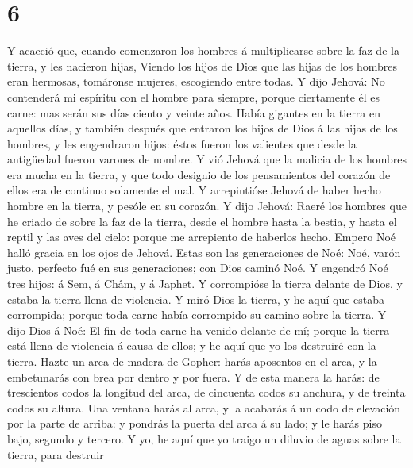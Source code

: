 \hypertarget{section-5}{%
\section{6}\label{section-5}}

 Y acaeció que, cuando comenzaron los hombres á
multiplicarse sobre la faz de la tierra, y les nacieron hijas,
 Viendo los hijos de Dios que las hijas de los hombres
eran hermosas, tomáronse mujeres, escogiendo entre todas. 
Y dijo Jehová: No contenderá mi espíritu con el hombre para siempre,
porque ciertamente él es carne: mas serán sus días ciento y veinte años.
 Había gigantes en la tierra en aquellos días, y también
después que entraron los hijos de Dios á las hijas de los hombres, y les
engendraron hijos: éstos fueron los valientes que desde la antigüedad
fueron varones de nombre.  Y vió Jehová que la malicia de
los hombres era mucha en la tierra, y que todo designio de los
pensamientos del corazón de ellos era de continuo solamente el mal.
 Y arrepintióse Jehová de haber hecho hombre en la tierra,
y pesóle en su corazón.  Y dijo Jehová: Raeré los hombres
que he criado de sobre la faz de la tierra, desde el hombre hasta la
bestia, y hasta el reptil y las aves del cielo: porque me arrepiento de
haberlos hecho.  Empero Noé halló gracia en los ojos de
Jehová.  Estas son las generaciones de Noé: Noé, varón
justo, perfecto fué en sus generaciones; con Dios caminó Noé.
 Y engendró Noé tres hijos: á Sem, á Châm, y á Japhet.
 Y corrompióse la tierra delante de Dios, y estaba la
tierra llena de violencia.  Y miró Dios la tierra, y he
aquí que estaba corrompida; porque toda carne había corrompido su camino
sobre la tierra.  Y dijo Dios á Noé: El fin de toda carne
ha venido delante de mí; porque la tierra está llena de violencia á
causa de ellos; y he aquí que yo los destruiré con la tierra.
 Hazte un arca de madera de Gopher: harás aposentos en el
arca, y la embetunarás con brea por dentro y por fuera. 
Y de esta manera la harás: de trescientos codos la longitud del arca, de
cincuenta codos su anchura, y de treinta codos su altura.
 Una ventana harás al arca, y la acabarás á un codo de
elevación por la parte de arriba: y pondrás la puerta del arca á su
lado; y le harás piso bajo, segundo y tercero.  Y yo, he
aquí que yo traigo un diluvio de aguas sobre la tierra, para destruir
